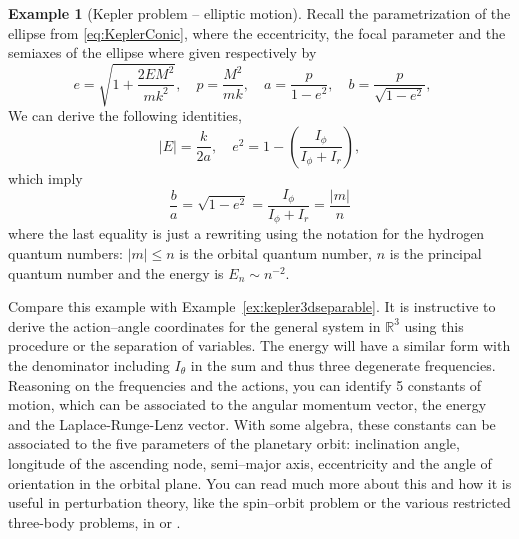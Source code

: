 \documentclass[english,fontsize=11pt,paper=b5]{scrbook}
\theoremstyle{definition}
\newtheorem{example}{Example}[chapter]
\begin{document}
\begin{example}[Kepler problem -- elliptic motion]
        Recall the parametrization of the ellipse from \eqref{eq:KeplerConic}, where the eccentricity, the focal parameter and the semiaxes of the ellipse where given respectively by
        \begin{equation}
          e = \sqrt{1+ \frac{2EM^2}{mk^2}}, \quad
          p = \frac{M^2}{mk}, \quad
          a = \frac{p}{1-e^2}, \quad
          b = \frac{p}{\sqrt{1-e^2}}, \quad
        \end{equation}
        We can derive the following identities,
        \begin{equation}
          |E| = \frac{k}{2a}, \quad e^2 = 1 - \left(\frac{I_\phi}{ I_\phi + I_r}\right),
        \end{equation}
        which imply
        \begin{equation}
          \frac{b}{a} = \sqrt{1-e^2} = \frac{I_\phi}{I_\phi + I_r} = \frac{|m|}{n}
        \end{equation}
        where the last equality is just a rewriting using the notation for the hydrogen quantum numbers: $|m| \leq n$ is the orbital quantum number, $n$ is the principal quantum number and the energy is $E_n \sim n^{-2}$.

        Compare this example with Example~\ref{ex:kepler3dseparable}.
        It is instructive to derive the action--angle coordinates for the general system in $\mathbb{R}^3$ using this procedure or the separation of variables.
        The energy will have a similar form with the denominator including $I_\theta$ in the sum and thus three degenerate frequencies.
        Reasoning on the frequencies and the actions, you can identify 5 constants of motion, which can be associated to the angular momentum vector, the energy and the Laplace-Runge-Lenz vector.
        With some algebra, these constants can be associated to the five parameters of the planetary orbit: inclination angle, longitude of the ascending node, semi--major axis, eccentricity and the angle of orientation in the orbital plane.
        You can read much more about this and how it is useful in perturbation theory, like the spin--orbit problem or the various restricted three-body problems, in \cite{book:arnoldcelestial} or \cite{book:celletti}.
      \end{example}
\end{document}
